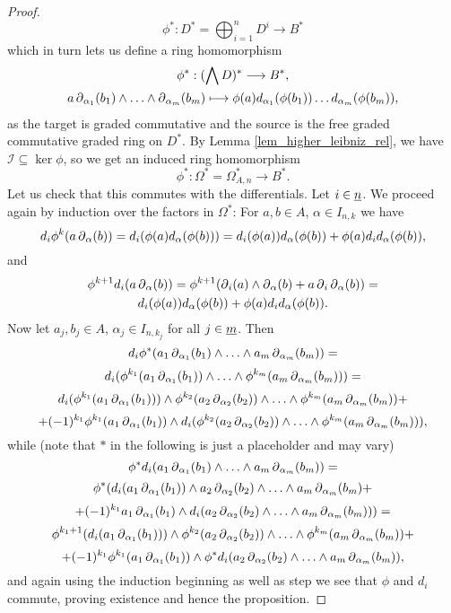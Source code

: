 \begin{prop}
\begin{proof}
    \[ \phi^*: D^* = \bigoplus_{i=1}^n D^i \to B^* \]
which in turn lets us define a ring homomorphism
  \begin{gather*}
    \phi ^*: (\bigwedge D)^* \to B^*, \\%
    a \del_{\alpha_1} (b_1) \wedge \ldots \wedge \del_{\alpha_m} (b_m) \mapsto%
    \phi(a) d_{\alpha_1} (\phi(b_1)) \ldots d_{\alpha_m} (\phi(b_m)),
  \end{gather*}
as the target is graded commutative and the source is the free graded commutative graded ring on $D^*$.
By Lemma \ref{lem_higher_leibniz_rel}, we have $\mathcal{I} \subseteq \ker \phi$, so we get an induced ring homomorphism%
\[\phi^*: \Omega^* = \Omega^*_{A,n} \to B^*.\]
Let us check that this commutes with the differentials. Let $i \in \underline{n}$. We proceed again by induction over the factors in $\Omega^*$: For $a,b \in A$, $\alpha \in I_{n,k}$ we have
    \[ d_i \phi^k ( a \del_\alpha (b) ) = d_i (\phi(a) d_\alpha(\phi(b)) ) = %
    d_i (\phi(a)) d_\alpha(\phi(b)) + \phi(a) d_i d_\alpha (\phi(b)), \]
and
  \begin{gather*}
    \phi^{k+1} d_i (a \del_\alpha (b)) = %
    \phi^{k+1} (\del_i (a) \wedge \del_\alpha (b) + 
      a \del_i \del_\alpha (b) ) = \\%
    d_i (\phi(a)) d_\alpha(\phi(b)) + \phi(a) d_i d_\alpha (\phi(b)).
  \end{gather*}
Now let $a_j, b_j \in A$, $\alpha_j \in I_{n,k_j}$ for all $j \in \underline{m}$.%
Then%
    \[ d_i \phi^* ( a_1 \del_{\alpha_1} (b_1) \wedge \ldots \wedge %
    a_m \del_{\alpha_m} (b_m) ) = \]%
    \[d_i ( \phi^{k_1}( a_1 \del_{\alpha_1} (b_1) ) \wedge \ldots \wedge %
    \phi^{k_m} ( a_m \del_{\alpha_m} (b_m) ) ) = \]%
    \[d_i ( \phi^{k_1}( a_1 \del_{\alpha_1} (b_1) ) ) \wedge %
    \phi^{k_2}( a_2 \del_{\alpha_2} (b_2) ) \wedge \ldots \wedge %
    \phi^{k_m}( a_m \del_{\alpha_m} (b_m) ) + \]%
    \[ + (-1)^{k_1} \phi^{k_1}( a_1 \del_{\alpha_1} (b_1) ) \wedge %
    d_i ( \phi^{k_2}( a_2 \del_{\alpha_2} (b_2) ) \wedge \ldots \wedge %
    \phi^{k_m}( a_m \del_{\alpha_m} (b_m) ) ),
    \]
while (note that $*$ in the following is just a placeholder and may vary)
    \[
    \phi^{*} d_i ( a_1 \del_{\alpha_1} (b_1) \wedge \ldots \wedge %
    a_m \del_{\alpha_m} (b_m) ) = \]%
    \[ \phi^{*} ( d_i ( a_1 \operatorname{\partial}_{\alpha_1} (b_1) ) \wedge a_2 \operatorname{\partial}_{\alpha_2} (b_2) \wedge \ldots \wedge a_m \operatorname{\partial}_{\alpha_m} (b_m) + \]%
    \[ + (-1)^{k_1} a_1 \del_{\alpha_1} (b_1) \wedge d_i (a_2 \del_{\alpha_2} (b_2) %
    \wedge \ldots \wedge a_m \del_{\alpha_m} (b_m)) ) = \]%
    \[\phi^{k_1+1} (d_i ( a_1 \del_{\alpha_1} (b_1) ) ) \wedge %
    \phi^{k_2}( a_2 \del_{\alpha_2} (b_2) ) \wedge \ldots \wedge %
    \phi^{k_m}( a_m \del_{\alpha_m} (b_m) ) + \]%
    \[ + (-1)^{k_1} \phi^{k_1}( a_1 \operatorname{\partial}_{\alpha_1} (b_1) ) \wedge \phi^* d_i (a_2 \operatorname{\partial}_{\alpha_2} (b_2) \wedge \ldots \wedge a_m \operatorname{\partial}_{\alpha_m} (b_m)), \]
and again using the induction beginning as well as step we see that $\phi$ and $d_i$ commute, proving existence and hence the proposition.
\end{proof}
\end{prop}
